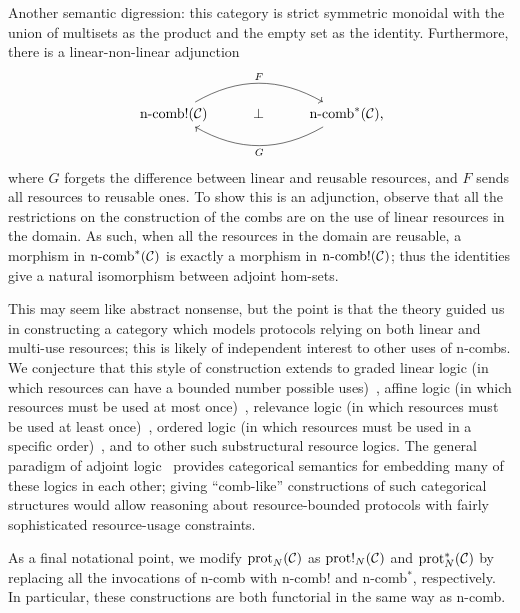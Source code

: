 Another semantic digression: this category is strict symmetric monoidal with the
union of multisets as the product and the empty set as the identity.
Furthermore, there is a linear-non-linear adjunction \[
  \begin{tikzcd}
    \ncombb{\cat{C}}\ar[rr, bend left, "F"] & \bot &
    \ncomba{\cat{C}}\punctuation{,}\ar[ll, bend left, "G"]
  \end{tikzcd}
\]
where $G$ forgets the difference between linear and reusable resources,
and $F$ sends all resources to reusable ones. To show this is an
adjunction, observe that all the restrictions on the construction of the combs
are on the use of linear resources in the domain. As such, when all the
resources in the domain are reusable, a morphism in $\operatorname*{n-comb}^*({\mathcal{C}})$ is
exactly a morphism in $\operatorname*{n-comb!}({\mathcal{C}})$; thus the identities give a natural
isomorphism between adjoint hom-sets.

This may seem like abstract nonsense, but the point is that the theory guided us
in constructing a category which models protocols relying on both linear and
multi-use resources; this is likely of independent interest to other uses of
n-combs. We conjecture that this style of construction extends to graded linear
logic (in which resources can have a bounded number possible
uses)~\cite{girard-1992}, affine logic (in which resources must be used at most
once)~\cite{troelstra-1992}, relevance logic (in which resources must be used at
least once)~\cite{dunn-1983}, ordered logic (in which resources must be used in
a specific order)~\cite{lambek-1958}, and to other such substructural resource
logics. The general paradigm of adjoint logic~\cite{pruiksma-2018} provides
categorical semantics for embedding many of these logics in each other; giving
``comb-like'' constructions of such categorical structures would allow reasoning
about resource-bounded protocols with fairly sophisticated resource-usage
constraints.

As a final notational point, we modify $\operatorname{prot}_{N}({\mathcal{C}})$ as
$\operatorname{prot}!_{N}({\mathcal{C}})$ and $\operatorname{prot}^*_{N}({\mathcal{C}})$ by replacing all the invocations
of n-comb with n-comb$!$ and n-comb$^*$, respectively. In particular, these
constructions are both functorial in the same way as n-comb.

